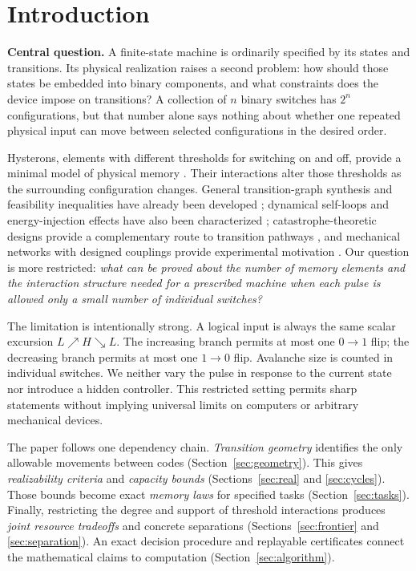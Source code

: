 \documentclass[12pt,letterpaper]{article}
\theoremstyle{definition}\newtheorem{definition}[theorem]{Definition}
\theoremstyle{remark}\newtheorem{remark}[theorem]{Remark}
\begin{document}
\section{Introduction}
\noindent\textbf{Central question.} A finite-state machine is ordinarily specified by its states and transitions. Its physical realization raises a second problem: how should those states be embedded into binary components, and what constraints does the device impose on transitions? A collection of $n$ binary switches has $2^n$ configurations, but that number alone says nothing about whether one repeated physical input can move between selected configurations in the desired order.

Hysterons, elements with different thresholds for switching on and off, provide a minimal model of physical memory \citep{preisach1935,liu2024}. Their interactions alter those thresholds as the surrounding configuration changes. General transition-graph synthesis and feasibility inequalities have already been developed \citep{teunisse2025}; dynamical self-loops and energy-injection effects have also been characterized \citep{baconnier2025}; catastrophe-theoretic designs provide a complementary route to transition pathways \citep{muhaxheri2025}, and mechanical networks with designed couplings provide experimental motivation \citep{shohat2025,paulsen2026,ali2026}. Our question is more restricted: \emph{what can be proved about the number of memory elements and the interaction structure needed for a prescribed machine when each pulse is allowed only a small number of individual switches?}

The limitation is intentionally strong. A logical input is always the same scalar excursion $L\nearrow H\searrow L$. The increasing branch permits at most one $0\to1$ flip; the decreasing branch permits at most one $1\to0$ flip. Avalanche size is counted in individual switches. We neither vary the pulse in response to the current state nor introduce a hidden controller. This restricted setting permits sharp statements without implying universal limits on computers or arbitrary mechanical devices.

The paper follows one dependency chain. \emph{Transition geometry} identifies the only allowable movements between codes (Section~\ref{sec:geometry}). This gives \emph{realizability criteria} and \emph{capacity bounds} (Sections~\ref{sec:real} and \ref{sec:cycles}). Those bounds become exact \emph{memory laws} for specified tasks (Section~\ref{sec:tasks}). Finally, restricting the degree and support of threshold interactions produces \emph{joint resource tradeoffs} and concrete separations (Sections~\ref{sec:frontier} and \ref{sec:separation}). An exact decision procedure and replayable certificates connect the mathematical claims to computation (Section~\ref{sec:algorithm}).
\end{document}
